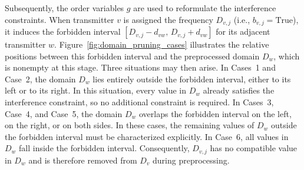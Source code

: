 \documentclass[letterpaper,journal]{IEEEtran}
\begin{document}
Subsequently, the order variables $g$ are used to reformulate the interference constraints. When transmitter $v$ is assigned the frequency $D_{v,j}$ (i.e., $b_{v,j}=\text{True}$), it induces the forbidden interval $[D_{v,j}-d_{vw},\,D_{v,j}+d_{vw}]$ for its adjacent transmitter $w$. Figure~\ref{fig:domain_pruning_cases} illustrates the relative positions between this forbidden interval and the preprocessed domain $D_w$, which is nonempty at this stage. Three situations may then arise. In Cases~1 and Case~2, the domain $D_w$ lies entirely outside the forbidden interval, either to its left or to its right. In this situation, every value in $D_w$ already satisfies the interference constraint, so no additional constraint is required. In Cases~3, Case~4, and Case~5, the domain $D_w$ overlaps the forbidden interval on the left, on the right, or on both sides. In these cases, the remaining values of $D_w$ outside the forbidden interval must be characterized explicitly. In Case~6, all values in $D_w$ fall inside the forbidden interval. Consequently, $D_{v,j}$ has no compatible value in $D_w$ and is therefore removed from $D_v$ during preprocessing.
\end{document}
